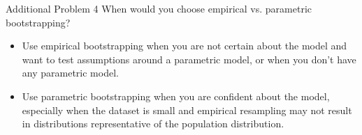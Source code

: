\documentclass{beamer}
\begin{document}
\begin{frame}{Additional Problem 4}
    When would you choose empirical vs. parametric bootstrapping?
    \pause
    \begin{itemize}
        \item Use empirical bootstrapping when you are not certain about the model and want to test assumptions around a parametric model, or when you don't have any parametric model.
        \pause
        \item Use parametric bootstrapping when you are confident about the model, especially when the dataset is small and empirical resampling may not result in distributions representative of the population distribution.
    \end{itemize}
\end{frame}
\end{document}
